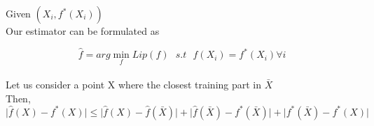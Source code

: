 \documentclass[11pt]{article}
\begin{document}
\begin{itemize}
\begin{itemize}
\begin{itemize}
Given \((X_i, f^*(X_i))\)\\
Our estimator can be formulated as\\
\end{itemize}
\[ \hat{f} = arg\min_f Lip(f) \ \ \ s.t \ \ \ f(X_i) = f^*(X_i) \forall  i\]\\
Let us consider a point X where the closest training part in \(\bar{X}\)\\
Then,\\
\(\lvert \hat{f}(X) - f^*(X) \rvert \leq
    \lvert \hat{f}(X) - \hat{f}(\bar{X}) \rvert +
    \lvert \hat{f}(\bar{X}) - f^*(\bar{X}) \rvert +
    \lvert f^*(\bar{X}) - f^*(X) \rvert\)\\
\end{itemize}
\end{itemize}
\end{document}
